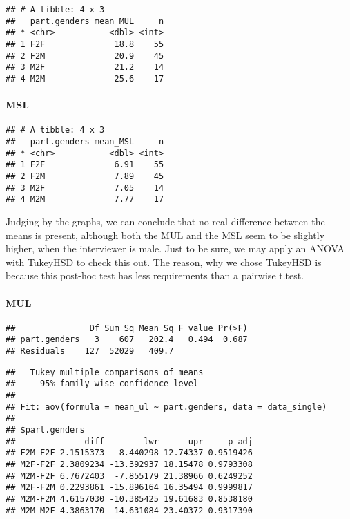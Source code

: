 \documentclass[
]{article}
\begin{document}
\begin{verbatim}
## # A tibble: 4 x 3
##   part.genders mean_MUL     n
## * <chr>           <dbl> <int>
## 1 F2F              18.8    55
## 2 F2M              20.9    45
## 3 M2F              21.2    14
## 4 M2M              25.6    17
\end{verbatim}

\hypertarget{msl-2}{%
\paragraph{MSL}\label{msl-2}}

\begin{verbatim}
## # A tibble: 4 x 3
##   part.genders mean_MSL     n
## * <chr>           <dbl> <int>
## 1 F2F              6.91    55
## 2 F2M              7.89    45
## 3 M2F              7.05    14
## 4 M2M              7.77    17
\end{verbatim}

Judging by the graphs, we can conclude that no real difference between
the means is present, although both the MUL and the MSL seem to be
slightly higher, when the interviewer is male. Just to be sure, we may
apply an ANOVA with TukeyHSD to check this out. The reason, why we chose
TukeyHSD is because this post-hoc test has less requirements than a
pairwise t.test.

\hypertarget{mul-3}{%
\paragraph{MUL}\label{mul-3}}

\begin{verbatim}
##               Df Sum Sq Mean Sq F value Pr(>F)
## part.genders   3    607   202.4   0.494  0.687
## Residuals    127  52029   409.7
\end{verbatim}

\begin{verbatim}
##   Tukey multiple comparisons of means
##     95% family-wise confidence level
## 
## Fit: aov(formula = mean_ul ~ part.genders, data = data_single)
## 
## $part.genders
##              diff        lwr      upr     p adj
## F2M-F2F 2.1515373  -8.440298 12.74337 0.9519426
## M2F-F2F 2.3809234 -13.392937 18.15478 0.9793308
## M2M-F2F 6.7672403  -7.855179 21.38966 0.6249252
## M2F-F2M 0.2293861 -15.896164 16.35494 0.9999817
## M2M-F2M 4.6157030 -10.385425 19.61683 0.8538180
## M2M-M2F 4.3863170 -14.631084 23.40372 0.9317390
\end{verbatim}
\end{document}
